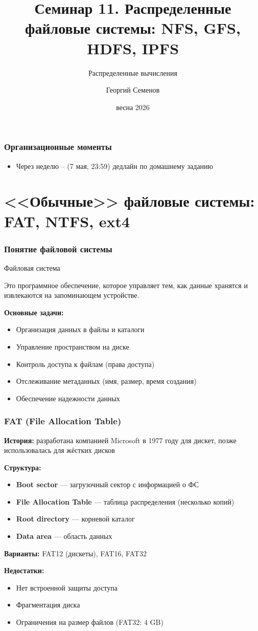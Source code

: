 \documentclass{beamer}
\title{Семинар 11. Распределенные файловые системы: NFS, GFS, HDFS, IPFS}
\subtitle{Распределенные вычисления}
\author{Георгий Семенов}
\institute{Институт прикладных компьютерных наук \\ Университет ИТМО}
\date{весна 2026}
\newenvironment{definitionbox}[1][Определение]{%
  \begin{exampleblock}{#1}
}{%
  \end{exampleblock}
}
\begin{document}
\frame{\titlepage}

\begin{frame}
\frametitle{Организационные моменты}

\begin{itemize}
  \item Через неделю – (7 мая, 23:59) дедлайн по домашнему заданию 
\end{itemize}

\end{frame}

\section{<<Обычные>> файловые системы: FAT, NTFS, ext4}

\begin{frame}
\frametitle{Понятие файловой системы}

\begin{definitionbox}[Файловая система]
  Это программное обеспечение, которое управляет тем, как данные хранятся и извлекаются на запоминающем устройстве.
\end{definitionbox}

\textbf{Основные задачи:}
\begin{itemize}
  \item Организация данных в файлы и каталоги
  \item Управление пространством на диске
  \item Контроль доступа к файлам (права доступа)
  \item Отслеживание метаданных (имя, размер, время создания)
  \item Обеспечение надежности данных
\end{itemize}

\end{frame}

\begin{frame}
\frametitle{FAT (File Allocation Table)}

\textbf{История:} разработана компанией Microsoft в 1977 году для дискет, позже использовалась для жёстких дисков

\textbf{Структура:}
\begin{itemize}
  \item \textbf{Boot sector} — загрузочный сектор с информацией о ФС
  \item \textbf{File Allocation Table} — таблица распределения (несколько копий)
  \item \textbf{Root directory} — корневой каталог
  \item \textbf{Data area} — область данных
\end{itemize}

\textbf{Варианты:} FAT12 (дискеты), FAT16, FAT32

\textbf{Недостатки:}
\begin{itemize}
  \item Нет встроенной защиты доступа
  \item Фрагментация диска
  \item Ограничения на размер файлов (FAT32: 4 GB)
\end{itemize}

\end{frame}
\end{document}
